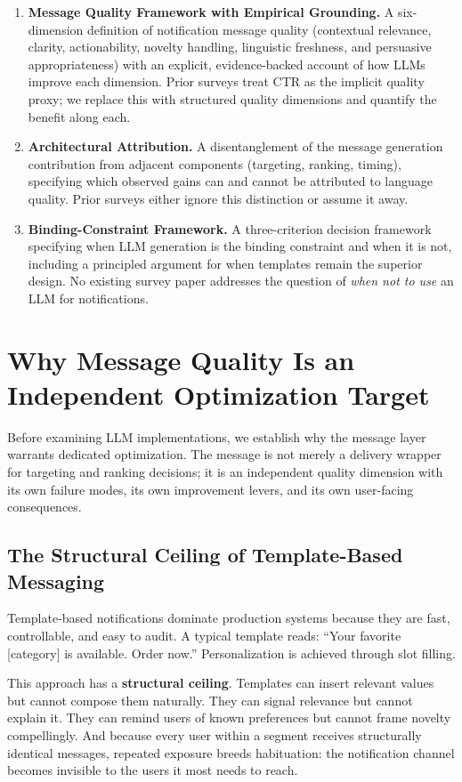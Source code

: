 \documentclass[11pt]{article}
\begin{document}
\begin{enumerate}
    \item \textbf{Message Quality Framework with Empirical Grounding.} A six-dimension definition of notification message quality (contextual relevance, clarity, actionability, novelty handling, linguistic freshness, and persuasive appropriateness) with an explicit, evidence-backed account of how LLMs improve each dimension. Prior surveys treat CTR as the implicit quality proxy; we replace this with structured quality dimensions and quantify the benefit along each.
    \item \textbf{Architectural Attribution.} A disentanglement of the message generation contribution from adjacent components (targeting, ranking, timing), specifying which observed gains can and cannot be attributed to language quality. Prior surveys either ignore this distinction or assume it away.
    \item \textbf{Binding-Constraint Framework.} A three-criterion decision framework specifying when LLM generation is the binding constraint and when it is not, including a principled argument for when templates remain the superior design. No existing survey paper addresses the question of \textit{when not to use} an LLM for notifications.
\end{enumerate}

\section{Why Message Quality Is an Independent Optimization Target}

Before examining LLM implementations, we establish why the message layer warrants dedicated optimization. The message is not merely a delivery wrapper for targeting and ranking decisions; it is an independent quality dimension with its own failure modes, its own improvement levers, and its own user-facing consequences.

\subsection{The Structural Ceiling of Template-Based Messaging}

Template-based notifications dominate production systems because they are fast, controllable, and easy to audit. A typical template reads: ``Your favorite [category] is available. Order now.'' Personalization is achieved through slot filling.

This approach has a \textbf{structural ceiling}. Templates can insert relevant values but cannot compose them naturally. They can signal relevance but cannot explain it. They can remind users of known preferences but cannot frame novelty compellingly. And because every user within a segment receives structurally identical messages, repeated exposure breeds habituation: the notification channel becomes invisible to the users it most needs to reach.
\end{document}
